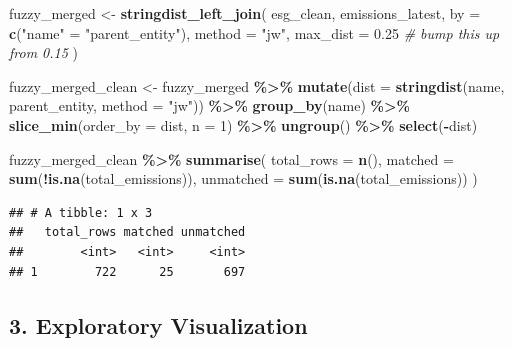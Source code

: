 \documentclass[
]{article}
\newenvironment{Shaded}{\begin{snugshade}}{\end{snugshade}}
\newcommand{\AttributeTok}[1]{\textcolor[rgb]{0.13,0.29,0.53}{#1}}
\newcommand{\CommentTok}[1]{\textcolor[rgb]{0.56,0.35,0.01}{\textit{#1}}}
\newcommand{\DecValTok}[1]{\textcolor[rgb]{0.00,0.00,0.81}{#1}}
\newcommand{\FloatTok}[1]{\textcolor[rgb]{0.00,0.00,0.81}{#1}}
\newcommand{\FunctionTok}[1]{\textcolor[rgb]{0.13,0.29,0.53}{\textbf{#1}}}
\newcommand{\NormalTok}[1]{#1}
\newcommand{\OtherTok}[1]{\textcolor[rgb]{0.56,0.35,0.01}{#1}}
\newcommand{\SpecialCharTok}[1]{\textcolor[rgb]{0.81,0.36,0.00}{\textbf{#1}}}
\newcommand{\StringTok}[1]{\textcolor[rgb]{0.31,0.60,0.02}{#1}}
\begin{document}
\begin{Shaded}
\begin{Highlighting}[]
\NormalTok{fuzzy\_merged }\OtherTok{\textless{}{-}} \FunctionTok{stringdist\_left\_join}\NormalTok{(}
\NormalTok{  esg\_clean,}
\NormalTok{  emissions\_latest,}
  \AttributeTok{by =} \FunctionTok{c}\NormalTok{(}\StringTok{"name"} \OtherTok{=} \StringTok{"parent\_entity"}\NormalTok{),}
  \AttributeTok{method =} \StringTok{"jw"}\NormalTok{,}
  \AttributeTok{max\_dist =} \FloatTok{0.25}  \CommentTok{\# bump this up from 0.15}
\NormalTok{)}

\NormalTok{fuzzy\_merged\_clean }\OtherTok{\textless{}{-}}\NormalTok{ fuzzy\_merged }\SpecialCharTok{\%\textgreater{}\%}
  \FunctionTok{mutate}\NormalTok{(}\AttributeTok{dist =} \FunctionTok{stringdist}\NormalTok{(name, parent\_entity, }\AttributeTok{method =} \StringTok{"jw"}\NormalTok{)) }\SpecialCharTok{\%\textgreater{}\%}
  \FunctionTok{group\_by}\NormalTok{(name) }\SpecialCharTok{\%\textgreater{}\%}
  \FunctionTok{slice\_min}\NormalTok{(}\AttributeTok{order\_by =}\NormalTok{ dist, }\AttributeTok{n =} \DecValTok{1}\NormalTok{) }\SpecialCharTok{\%\textgreater{}\%}
  \FunctionTok{ungroup}\NormalTok{() }\SpecialCharTok{\%\textgreater{}\%}
  \FunctionTok{select}\NormalTok{(}\SpecialCharTok{{-}}\NormalTok{dist)}

\NormalTok{fuzzy\_merged\_clean }\SpecialCharTok{\%\textgreater{}\%}
  \FunctionTok{summarise}\NormalTok{(}
    \AttributeTok{total\_rows =} \FunctionTok{n}\NormalTok{(),}
    \AttributeTok{matched =} \FunctionTok{sum}\NormalTok{(}\SpecialCharTok{!}\FunctionTok{is.na}\NormalTok{(total\_emissions)),}
    \AttributeTok{unmatched =} \FunctionTok{sum}\NormalTok{(}\FunctionTok{is.na}\NormalTok{(total\_emissions))}
\NormalTok{  )}
\end{Highlighting}
\end{Shaded}

\begin{verbatim}
## # A tibble: 1 x 3
##   total_rows matched unmatched
##        <int>   <int>     <int>
## 1        722      25       697
\end{verbatim}

\hypertarget{exploratory-visualization}{%
\subsection{3. Exploratory
Visualization}\label{exploratory-visualization}}
\end{document}
